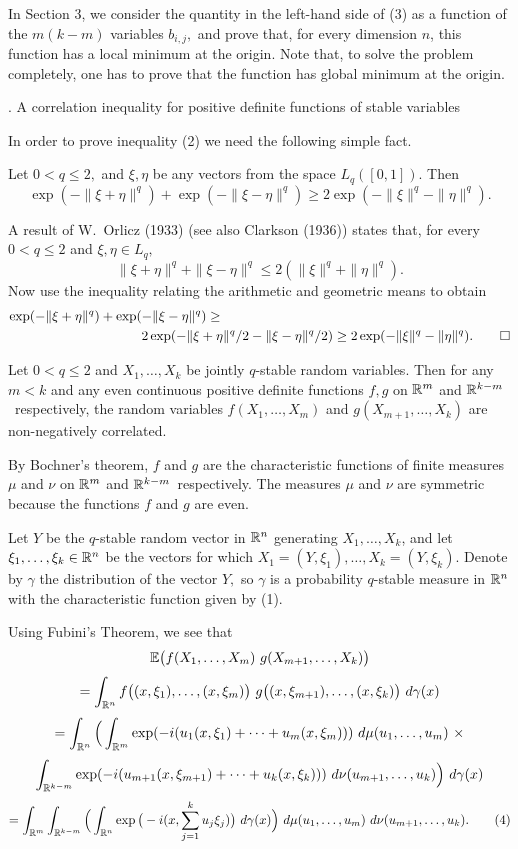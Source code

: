 In Section 3, we consider the quantity
in the left-hand side of (3) as a function of the $m(k-m)$
variables $b_{i,j},$ and prove that, for every dimension $n$, 
this function has a local
minimum at the origin. Note that, to solve the problem completely, 
one has to prove that the function has global minimum at the
origin.

. A correlation inequality for positive definite functions
of stable variables \endhead

In order to prove inequality (2) we need the
following simple fact.

 Let $0<q\le 2,$ and  $\xi,\eta$ be any 
vectors from the space $L_q([0,1]).$ Then
$$\exp(-\|\xi+\eta\|^q) + \exp(-\|\xi-\eta\|^q) \ge
2\exp(-\|\xi\|^q-\|\eta\|^q).$$
\endproclaim

  A result of W.~Orlicz (1933) (see also Clarkson (1936))
states that, for every $0<q\le 2$
and $\xi,\eta\in L_q,$ 
$$\|\xi+\eta\|^q+\|\xi-\eta\|^q\le 2(\|\xi\|^q+\|\eta\|^q).$$
Now use the inequality relating the arithmetic and geometric
means to obtain
$$\split \exp(-\|\xi+\eta\|^q) + \exp(-\|\xi-\eta\|^q)\ge  
\kern 3 true in\\
2\exp(-\|\xi+\eta\|^q/2-\|\xi-\eta\|^q/2)\ge 
2\exp(-\|\xi\|^q-\|\eta\|^q).\qed \endsplit $$ 
\enddemo

\medbreak

 Let $0<q\le 2$ and $X_1,\dots,X_k$ be 
jointly $q$-stable random variables. Then for any $m<k$
and any even continuous positive definite functions $f,g$ on $\Bbb R^m$
and $\Bbb R^{k-m}$\ respectively, the random variables $f(X_1,\dots,X_m)$
and $g(X_{m+1},\dots,X_k)$ are non-negatively correlated.
\endproclaim

 By Bochner's theorem, $f$ and $g$ are the 
characteristic functions of finite measures
$\mu$ and $\nu$ on $\Bbb R^m$ and $\Bbb R^{k-m}$\ respectively.
The measures $\mu$ and $\nu$ are symmetric because the functions
$f$ and $g$ are even.

Let $Y$ be the $q$-stable random vector in $\Bbb R^n$
generating $X_1,\dots,X_k$, and let 
$\xi_1,\dots,\xi_k\in \Bbb R^n$ be the vectors 
for which $X_1=(Y,\xi_1),\dots, X_k=(Y,\xi_k)$.  Denote by $\gamma$
the distribution of the vector $Y,$ so $\gamma$ is a probability
$q$-stable measure in $\Bbb R^n$ with the characteristic 
function given by (1).

Using Fubini's Theorem, we see that
$$ \Bbb E\big(f(X_1,\dots, X_m)\  g(X_{m+1},\dots, X_k)\big) $$
$$ = \int_{\Bbb R^n} f\big((x,\xi_1),\dots,(x,\xi_m)\big)
\ g\big((x,\xi_{m+1}),\dots,(x,\xi_k)\big)\ d\gamma(x) $$
$$ = \int_{\Bbb R^n} \Big( \int_{\Bbb R^m} 
\exp(-i(u_1(x,\xi_1)+\dots+u_m(x,\xi_m)))\ d\mu(u_1,\dots,u_m)\ \times $$
$$ \int_{\Bbb R^{k-m}} 
\exp(-i(u_{m+1}(x,\xi_{m+1})+\dots+u_k(x,\xi_k))) 
\ d\nu(u_{m+1},\dots,u_k) \Big) \ d\gamma(x) $$ 
$$ = \int_{\Bbb R^m}\int_{\Bbb R^{k-m}} \Big(
\int_{\Bbb R^n} \exp\big(-i(x,\sum_{j=1}^k u_j\xi_j)\big)
\ d\gamma(x) \Big)
\ d\mu(u_1,\dots,u_m)\ d\nu(u_{m+1},\dots,u_k). \tag{4} $$ 

